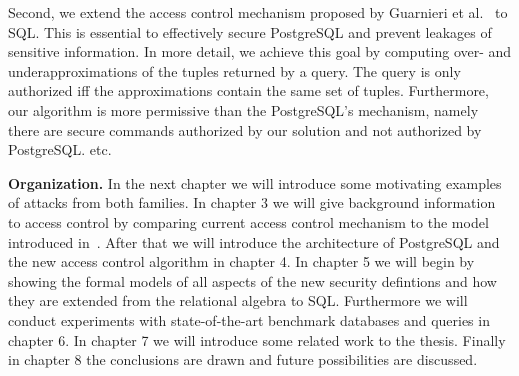 Second, we extend the access control mechanism proposed by Guarnieri et al.~\cite{guarnieri2016strong} to SQL.
%
This is essential to effectively secure PostgreSQL and prevent leakages of sensitive information.
%
In more detail, we achieve this goal by computing over- and underapproximations of the tuples returned by a query. The query is only authorized iff the approximations contain the same set of tuples.
%
%
Furthermore, our algorithm is  more permissive than the PostgreSQL's mechanism, namely there are secure commands authorized by our solution and not authorized by PostgreSQL. etc.  

\smallskip
\noindent
{\bf Organization.}
%
In the next chapter we will introduce some motivating examples of attacks from both families. 
%
In chapter 3 we will give background information to access control by comparing current access control mechanism to the model introduced in~\cite{guarnieri2016strong}.
%
After that we will introduce the architecture of PostgreSQL and the new access control algorithm in chapter 4. 
%
In chapter 5 we will begin by showing the formal models of all aspects of the new security defintions and how they are extended from the relational algebra to SQL. 
%
Furthermore we will conduct experiments with state-of-the-art benchmark databases and queries in chapter 6. 
%
In chapter 7 we will introduce some related work to the thesis. 
%
Finally in chapter 8 the conclusions are drawn and future possibilities are discussed.